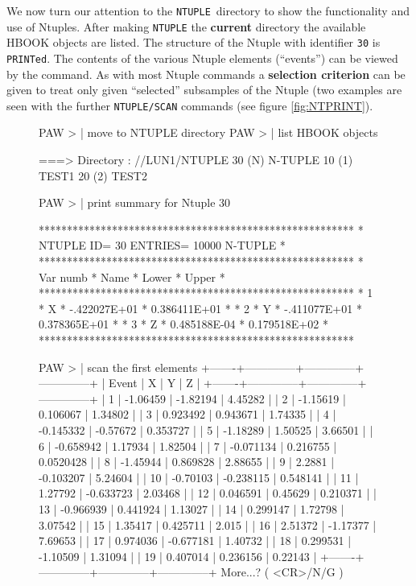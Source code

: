 We now turn our attention to the \texttt{NTUPLE}~directory to
show the functionality and use of Ntuples.
After making \texttt{NTUPLE} the {\bf current} directory
the available HBOOK objects are listed. The structure of the
Ntuple with identifier \texttt{30} is \texttt{PRINTed}.
The contents of the various Ntuple elements (``events'')
can be viewed by the  command.
As with most Ntuple commands a {\bf selection criterion}
can be given to treat only given ``selected'' subsamples
of the Ntuple (two examples are seen with the further
\texttt{NTUPLE/SCAN} commands (see figure \ref{fig:NTPRINT}).

\begin{figure}
\begin{salltt}
 PAW >                                 | move to NTUPLE directory
 PAW >                                     | list HBOOK objects
 
 ===> Directory : //LUN1/NTUPLE
         30 (N)   N-TUPLE
         10 (1)   TEST1
         20 (2)   TEST2
 
 PAW >                               | print summary for Ntuple 30
 
 ********************************************************
 * NTUPLE ID=   30  ENTRIES=  10000   N-TUPLE           *
 ********************************************************
 *  Var numb  *   Name    *    Lower     *    Upper     *
 ********************************************************
 *      1     *    X      * -.422027E+01 * 0.386411E+01 *
 *      2     *    Y      * -.411077E+01 * 0.378365E+01 *
 *      3     *    Z      * 0.485188E-04 * 0.179518E+02 *
 ********************************************************
 
 PAW >                                | scan the first elements
+-------+--------------+--------------+--------------+
| Event |   X          |   Y          |   Z          |
+-------+--------------+--------------+--------------+
|     1 | -1.06459     | -1.82194     |  4.45282     |
|     2 | -1.15619     |  0.106067    |  1.34802     |
|     3 |  0.923492    |  0.943671    |  1.74335     |
|     4 | -0.145332    | -0.57672     |  0.353727    |
|     5 | -1.18289     |  1.50525     |  3.66501     |
|     6 | -0.658942    |  1.17934     |  1.82504     |
|     7 | -0.071134    |  0.216755    |  0.0520428   |
|     8 | -1.45944     |  0.869828    |  2.88655     |
|     9 |  2.2881      | -0.103207    |  5.24604     |
|    10 | -0.70103     | -0.238115    |  0.548141    |
|    11 |  1.27792     | -0.633723    |  2.03468     |
|    12 |  0.046591    |  0.45629     |  0.210371    |
|    13 | -0.966939    |  0.441924    |  1.13027     |
|    14 |  0.299147    |  1.72798     |  3.07542     |
|    15 |  1.35417     |  0.425711    |  2.015       |
|    16 |  2.51372     | -1.17377     |  7.69653     |
|    17 |  0.974036    | -0.677181    |  1.40732     |
|    18 |  0.299531    | -1.10509     |  1.31094     |
|    19 |  0.407014    |  0.236156    |  0.22143     |
+-------+--------------+--------------+--------------+
More...? ( <CR>/N/G ) 


\end{salltt}
\end{figure}
